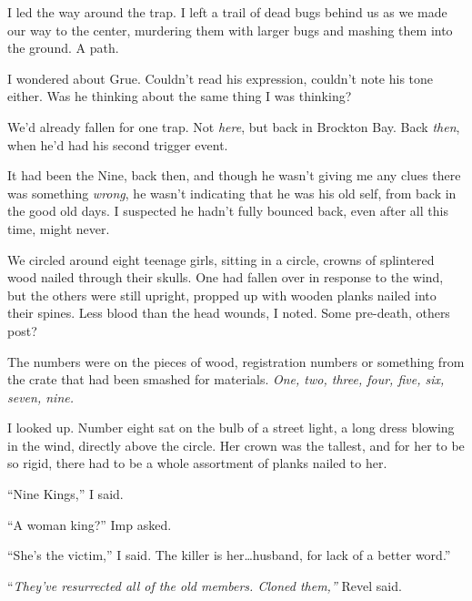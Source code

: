 I led the way around the trap.  I left a trail of dead bugs behind us as we made our way to the center, murdering them with larger bugs and mashing them into the ground.  A path.



I wondered about Grue.  Couldn't read his expression, couldn't note his tone either.  Was he thinking about the same thing I was thinking?



We'd already fallen for one trap.  Not \emph{here}, but back in Brockton Bay.  Back \emph{then}, when he'd had his second trigger event.



It had been the Nine, back then, and though he wasn't giving me any clues there was something \emph{wrong}, he wasn't indicating that he was his old self, from back in the good old days.  I suspected he hadn't fully bounced back, even after all this time, might never.



We circled around eight teenage girls, sitting in a circle, crowns of splintered wood nailed through their skulls.  One had fallen over in response to the wind, but the others were still upright, propped up with wooden planks nailed into their spines.  Less blood than the head wounds, I noted.  Some pre-death, others post?



The numbers were on the pieces of wood, registration numbers or something from the crate that had been smashed for materials.  \emph{One, two, three, four, five, six, seven, nine.}



I looked up.  Number eight sat on the bulb of a street light, a long dress blowing in the wind, directly above the circle.  Her crown was the tallest, and for her to be so rigid, there had to be a whole assortment of planks nailed to her.



``Nine Kings,'' I said.



``A woman king?'' Imp asked.



``She's the victim,'' I said.  The killer is her\ldots husband, for lack of a better word.''



``\emph{They've resurrected all of the old members.  Cloned them,'' }Revel said.



